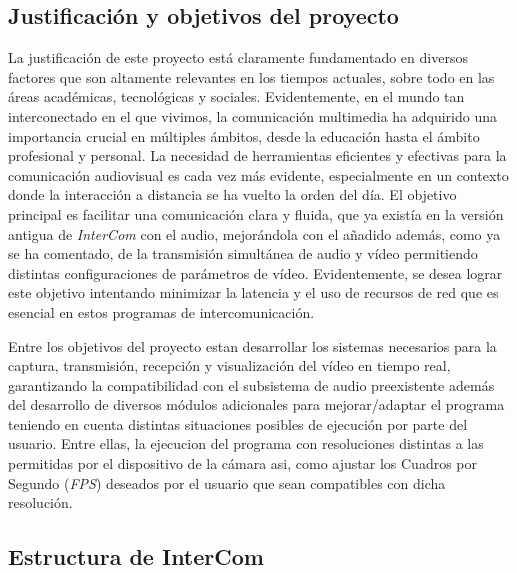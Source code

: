 \subsection{Justificación y objetivos del proyecto}
La justificación de este proyecto está claramente fundamentado en diversos factores que son altamente relevantes en los tiempos actuales, sobre todo en las áreas académicas, tecnológicas y sociales. Evidentemente, en el mundo tan interconectado en el que vivimos, la comunicación multimedia ha adquirido una importancia crucial en múltiples ámbitos, desde la educación hasta el ámbito profesional y personal. La necesidad de herramientas eficientes y efectivas para la comunicación audiovisual es cada vez más evidente, especialmente en un contexto donde la interacción a distancia se ha vuelto la orden del día.\cite{GSMA}
\vspace{\baselineskip}
\vspace{\baselineskip}
El objetivo principal es facilitar una comunicación clara y fluida, que ya existía en la versión antigua de \textit{InterCom} con el audio, mejorándola con el añadido además, como ya se ha comentado, de la transmisión simultánea de audio y vídeo permitiendo distintas configuraciones de parámetros de vídeo. Evidentemente, se desea lograr este objetivo intentando minimizar la latencia y el uso de recursos de red que es esencial en estos programas de intercomunicación.

\vspace{\baselineskip}
\vspace{\baselineskip}
Entre los objetivos del proyecto estan desarrollar los sistemas necesarios para la captura, transmisión, recepción y visualización del vídeo en tiempo real, garantizando la compatibilidad con el subsistema de audio preexistente además del desarrollo de diversos módulos adicionales para mejorar/adaptar el programa teniendo en cuenta distintas situaciones posibles de ejecución por parte del usuario. Entre ellas, la ejecucion del programa con resoluciones distintas a las permitidas por el dispositivo de la cámara asi, como ajustar los Cuadros por Segundo (\textit{FPS}) deseados por el usuario que sean compatibles con dicha resolución.
\vspace{\baselineskip}


\subsection{Estructura de InterCom}

